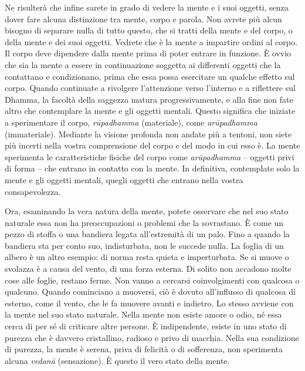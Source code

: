 Ne risulterà che infine sarete in grado di vedere la mente e i suoi
oggetti, senza dover fare alcuna distinzione tra mente, corpo e parola.
Non avrete più alcun bisogno di separare nulla di tutto questo, che si
tratti della mente e del corpo, o della mente e dei suoi oggetti.
Vedrete che è la mente a impartire ordini al corpo. Il corpo deve
dipendere dalla mente prima di poter entrare in funzione. È ovvio che
sia la mente a essere in continuazione soggetta ai differenti oggetti
che la contattano e condizionano, prima che essa possa esercitare un
qualche effetto sul corpo. Quando continuate a rivolgere l'attenzione
verso l'interno e a riflettere sul Dhamma, la facoltà della saggezza
matura progressivamente, e alla fine non fate altro che contemplare la
mente e gli oggetti mentali. Questo significa che iniziate a
sperimentare il corpo, \emph{rūpadhamma} (materiale), come
\emph{arūpadhamma} (immateriale). Mediante la visione profonda non
andate più a tentoni, non siete più incerti nella vostra comprensione
del corpo e del modo in cui esso è. La mente sperimenta le
caratteristiche fisiche del corpo come \emph{arūpadhamma} -- oggetti
privi di forma -- che entrano in contatto con la mente. In definitiva,
contemplate solo la mente e gli oggetti mentali, quegli oggetti che
entrano nella vostra consapevolezza.

Ora, esaminando la vera natura della mente, potete osservare che nel suo
stato naturale essa non ha preoccupazioni o problemi che la sovrastano.
È come un pezzo di stoffa o una bandiera legata all'estremità di un
palo. Fino a quando la bandiera sta per conto suo, indisturbata, non le
succede nulla. La foglia di un albero è un altro esempio: di norma resta
quieta e imperturbata. Se si muove o svolazza è a causa del vento, di
una forza esterna. Di solito non accadono molte cose alle foglie,
restano ferme. Non vanno a cercarsi coinvolgimenti con qualcosa o
qualcuno. Quando cominciano a muoversi, ciò è dovuto all'influsso di
qualcosa di esterno, come il vento, che le fa muovere avanti e indietro.
Lo stesso avviene con la mente nel suo stato naturale. Nella mente non
esiste amore o odio, né essa cerca di per sé di criticare altre persone.
È indipendente, esiste in uno stato di purezza che è davvero
cristallino, radioso e privo di macchia. Nella sua condizione di
purezza, la mente è serena, priva di felicità o di sofferenza, non
sperimenta alcuna \emph{vedanā} (sensazione). È questo il vero stato
della mente.

